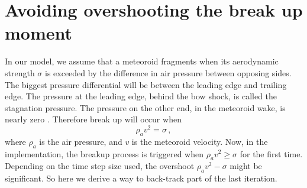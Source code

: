 \section{Avoiding overshooting the break up moment}
\label{sec:overshoot}
In our model, we assume that a meteoroid fragments when its aerodynamic strength $\sigma$ is exceeded by the difference in air pressure between opposing sides. The biggest pressure differential will be between the leading edge and trailing edge. The pressure at the leading edge, behind the bow shock, is called the stagnation pressure. The pressure on the other end, in the meteoroid wake, is nearly zero \citep{passey1980effects}. Therefore break up will occur when
\begin{equation}
    \rho_a v^2 = \sigma\,,
\end{equation}
where $\rho_a$ is the air pressure, and $v$ is the meteoroid velocity. Now, in the implementation, the breakup process is triggered when $\rho_a v^2 \geq \sigma$ for the first time. Depending on the time step size used, the overshoot $\rho_a v^2 - \sigma$ might be significant. So here we derive a way to back-track part of the last iteration.

